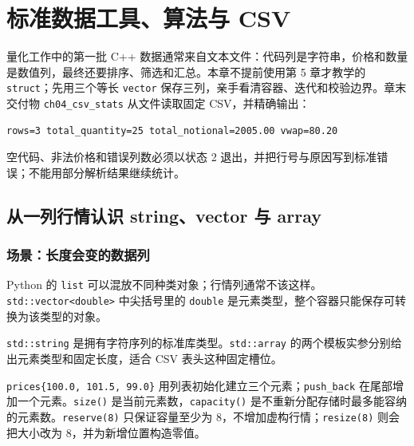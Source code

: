 \chapter{标准数据工具、算法与 CSV}


量化工作中的第一批 C++ 数据通常来自文本文件：代码列是字符串，价格和数量是数值列，最终还要排序、筛选和汇总。本章不提前使用第 5 章才教学的 \texttt{struct}；先用三个等长 \texttt{vector} 保存三列，亲手看清容器、迭代和校验边界。章末交付物 \texttt{ch04\_csv\_stats} 从文件读取固定 CSV，并精确输出：

\begin{lstlisting}
rows=3 total_quantity=25 total_notional=2005.00 vwap=80.20
\end{lstlisting}

空代码、非法价格和错误列数必须以状态 2 退出，并把行号与原因写到标准错误；不能用部分解析结果继续统计。

\section{从一列行情认识 string、vector 与 array}

\subsection{场景：长度会变的数据列}

Python 的 \texttt{list} 可以混放不同种类对象；行情列通常不该这样。\texttt{std::vector<double>} 中尖括号里的 \texttt{double} 是元素类型，整个容器只能保存可转换为该类型的对象。

\texttt{std::string} 是拥有字符序列的标准库类型。\texttt{std::array} 的两个模板实参分别给出元素类型和固定长度，适合 CSV 表头这种固定槽位。



\texttt{prices\{100.0, 101.5, 99.0\}} 用列表初始化建立三个元素；\texttt{push\_back} 在尾部增加一个元素。\texttt{size()} 是当前元素数，\texttt{capacity()} 是不重新分配存储时最多能容纳的元素数。\texttt{reserve(8)} 只保证容量至少为 8，不增加虚构行情；\texttt{resize(8)} 则会把大小改为 8，并为新增位置构造零值。

